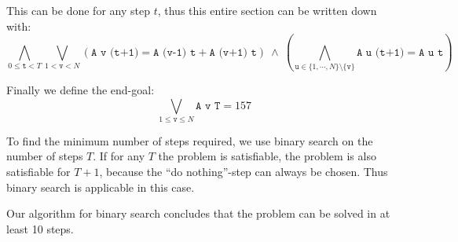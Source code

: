 \documentclass[12pt]{article}
\begin{document}
This can be done for any step $t$, thus this entire section can be written down with:
\[
    \bigwedge_{0 \le \texttt{t} < T}
    \bigvee_{1 < \texttt{v} < N}
        \left (\texttt{A v (t+1)} = \texttt{A (v-1) t} + \texttt{A (v+1) t} \right)
        ~\wedge~
        \left( \bigwedge_{ \texttt{u} \in \{1, \cdots, N\} \setminus \{ \texttt{v} \} } \texttt{A u (t+1)} = \texttt{A u t} \right)
\]

Finally we define the end-goal:
\[ \bigvee_{1 \le \texttt{v} \le N} \texttt{A v T} = 157 \]

To find the minimum number of steps required, we use binary search on the number of steps $T$.
If for any $T$ the problem is satisfiable, the problem is also satisfiable for $T+1$, because the ``do nothing''-step can always be chosen.
Thus binary search is applicable in this case.

Our algorithm for binary search concludes that the problem can be solved in at least 10 steps.
\end{document}

